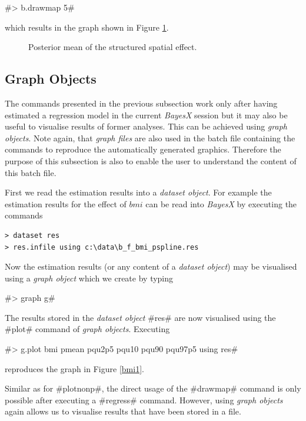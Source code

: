 \documentclass{article}
\begin{document}
#> b.drawmap 5#

which results in the graph shown in Figure \ref{spat1}.

\begin{figure}[ht]
\begin{center}
{\it\caption{Posterior mean of the structured spatial
effect.\label{spat1}}}
\end{center}
\end{figure}

\subsection{Graph Objects}

The commands presented in the previous subsection work only after
having estimated a regression model in the current {\em BayesX}
session but it may also be useful to visualise results of former
analyses. This can be achieved using {\em graph objects}. Note
again, that {\em graph files} are also used in the batch file
containing the commands to reproduce the automatically generated
graphics. Therefore the purpose of this subsection is also to enable
the user to understand the content of this batch file.

First we read the estimation results into a {\it dataset object}.
For example the estimation results for the effect of $bmi$ can be
read into {\it BayesX} by executing the commands

\begin{verbatim}
> dataset res
> res.infile using c:\data\b_f_bmi_pspline.res
\end{verbatim}

Now the estimation results (or any content of a {\it dataset
object}) may be visualised using a {\it graph object} which we
create by typing

#> graph g#

The results stored in the {\em dataset object} #res# are now
visualised using the #plot# command of {\it graph objects}.
Executing

#> g.plot bmi pmean pqu2p5 pqu10 pqu90 pqu97p5 using res#

reproduces the graph in Figure \ref{bmi1}.

Similar as for #plotnonp#, the direct usage of the #drawmap#
command is only possible after executing a #regress# command.
However, using {\it graph objects} again allows us to visualise
results that have been stored in a file.
\end{document}
